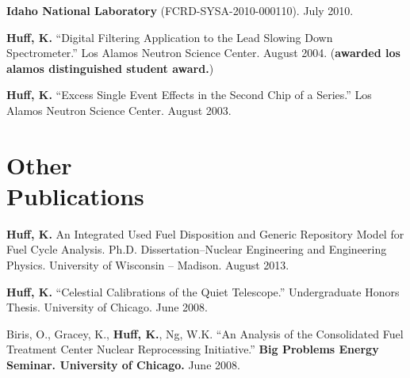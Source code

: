 \documentclass[margin,line]{resume}
\begin{document}
\begin{resume}
\begin{bibenum}
        \textbf{Idaho National Laboratory} (FCRD-SYSA-2010-000110). July 2010.
      \item \textbf{Huff, K.} ``Digital Filtering Application to the Lead Slowing Down
        Spectrometer.'' Los Alamos Neutron Science Center. August 2004.  %
        (\textbf{awarded los alamos distinguished student award.})
      \item \textbf{Huff, K.} ``Excess Single Event Effects in the Second Chip of a Series.''
        Los Alamos Neutron Science Center. August 2003.
    \end{bibenum}
    \section{\mysidestyle Other\\Publications}
    \begin{bibenum}
      \item \textbf{Huff, K.} An Integrated Used Fuel Disposition and Generic Repository Model for Fuel Cycle Analysis.
        Ph.D. Dissertation--Nuclear Engineering and Engineering
        Physics. University of Wisconsin -- Madison.  August 2013.
      \item \textbf{Huff, K.} ``Celestial Calibrations of the Quiet Telescope.''
        Undergraduate Honors Thesis. University of Chicago. June 2008.
      \item Biris, O., Gracey, K., \textbf{Huff, K.}, Ng, W.K.
        ``An Analysis of the Consolidated Fuel Treatment Center Nuclear
        Reprocessing Initiative.''
        \textbf{Big Problems Energy Seminar. University of Chicago.} June 2008.
    \end{bibenum}

\end{resume}
\end{document}
